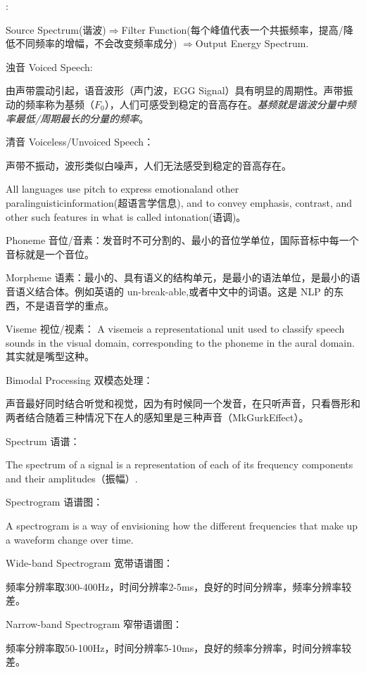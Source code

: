 :

Source Spectrum(谐波)$\Rightarrow$Filter Function(每个峰值代表一个共振频率，提高/降低不同频率的增幅，不会改变频率成分) $\Rightarrow$Output Energy Spectrum.


浊音 Voiced Speech:

由声带震动引起，语音波形（声门波，EGG Signal）具有明显的周期性。声带振动的频率称为基频（$F_0$），人们可感受到稳定的音高存在。\emph{基频就是谐波分量中频率最低/周期最长的分量的频率}。

清音 Voiceless/Unvoiced Speech：

声带不振动，波形类似白噪声，人们无法感受到稳定的音高存在。

All languages use pitch to express emotionaland other paralinguisticinformation(超语言学信息), and to convey emphasis, contrast, and other such features in what is called intonation(语调)。

Phoneme 音位/音素：发音时不可分割的、最小的音位学单位，国际音标中每一个音标就是一个音位。

Morpheme 语素：最小的、具有语义的结构单元，是最小的语法单位，是最小的语音语义结合体。例如英语的 un-break-able,或者中文中的词语。这是 NLP 的东西，不是语音学的重点。

Viseme 视位/视素：
A visemeis a representational unit used to classify speech sounds in the visual domain, corresponding to the phoneme in the aural domain.
其实就是嘴型这种。

Bimodal Processing 双模态处理：

声音最好同时结合听觉和视觉，因为有时候同一个发音，在只听声音，只看唇形和两者结合随着三种情况下在人的感知里是三种声音（MkGurkEffect）。

Spectrum 语谱：

The spectrum of a signal is a representation of each of its frequency components and their amplitudes（振幅）.

Spectrogram 语谱图：

A spectrogram is a way of envisioning how the different frequencies that make up a waveform change over time.

Wide-band Spectrogram 宽带语谱图：

频率分辨率取300-400Hz，时间分辨率2-5ms，良好的时间分辨率，频率分辨率较差。

Narrow-band Spectrogram 窄带语谱图：

频率分辨率取50-100Hz，时间分辨率5-10ms，良好的频率分辨率，时间分辨率较差。

